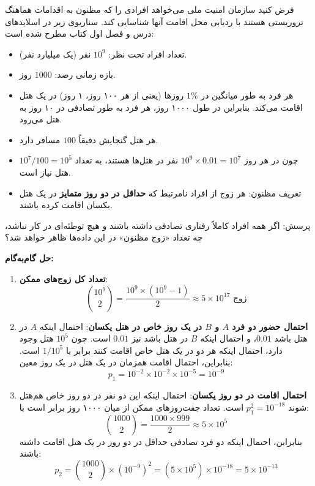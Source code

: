 \begin{example}
فرض کنید سازمان امنیت ملی می‌خواهد افرادی را که مظنون به اقدامات هماهنگ تروریستی هستند با ردیابی محل اقامت آنها شناسایی کند. سناریوی زیر در اسلایدهای درس و فصل اول کتاب مطرح شده است:
\begin{itemize}
    \item تعداد افراد تحت نظر: $10^9$ نفر (یک میلیارد نفر).
    \item بازه زمانی رصد: $1000$ روز.
    \item هر فرد به طور میانگین در $1\%$ روزها (یعنی از هر ۱۰۰ روز، ۱ روز) در یک هتل اقامت می‌کند. بنابراین در طول ۱۰۰۰ روز، هر فرد به طور تصادفی در ۱۰ روز به هتل می‌رود.
    \item هر هتل گنجایش دقیقاً $100$ مسافر دارد.
    \item چون در هر روز $10^9 \times 0.01 = 10^7$ نفر در هتل‌ها هستند، به تعداد $10^7 / 100 = 10^5$ هتل نیاز است.
    \item تعریف مظنون: هر زوج از افراد نامرتبط که \textbf{حداقل در دو روز متمایز} در یک هتل یکسان اقامت کرده باشند.
\end{itemize}
پرسش: اگر همه افراد کاملاً رفتاری تصادفی داشته باشند و هیچ توطئه‌ای در کار نباشد، چه تعداد «زوج مظنون» در این داده‌ها ظاهر خواهد شد؟

\textbf{حل گام‌به‌گام:}
\begin{enumerate}
    \item \textbf{تعداد کل زوج‌های ممکن}:
    \begin{equation}
    \binom{10^9}{2} = \frac{10^9 \times (10^9 - 1)}{2} \approx 5 \times 10^{17} \text{ زوج}
    \end{equation}
    
    \item \textbf{احتمال حضور دو فرد $A$ و $B$ در یک روز خاص در هتل یکسان}:
    احتمال اینکه $A$ در هتل باشد $0.01$، و احتمال اینکه $B$ در هتل باشد نیز $0.01$ است. چون $10^5$ هتل وجود دارد، احتمال اینکه هر دو در یک هتل خاص اقامت کنند برابر با $1/10^5$ است. بنابراین، احتمال اقامت همزمان در یک هتل در یک روز معین:
    \begin{equation}
    p_1 = 10^{-2} \times 10^{-2} \times 10^{-5} = 10^{-9}
    \end{equation}
    
    \item \textbf{احتمال اقامت در دو روز یکسان}:
    احتمال اینکه این دو نفر در دو روز خاص هم‌هتل شوند $p_1^2 = 10^{-18}$ است. تعداد جفت‌روزهای ممکن از میان ۱۰۰۰ روز برابر است با:
    \begin{equation}
    \binom{1000}{2} = \frac{1000 \times 999}{2} \approx 5 \times 10^5
    \end{equation}
    بنابراین، احتمال اینکه دو فرد تصادفی حداقل در دو روز در یک هتل اقامت داشته باشند:
    \begin{equation}
    p_2 = \binom{1000}{2} \times (10^{-9})^2 = (5 \times 10^5) \times 10^{-18} = 5 \times 10^{-13}
    \end{equation}
    

\end{enumerate}
\end{example}
